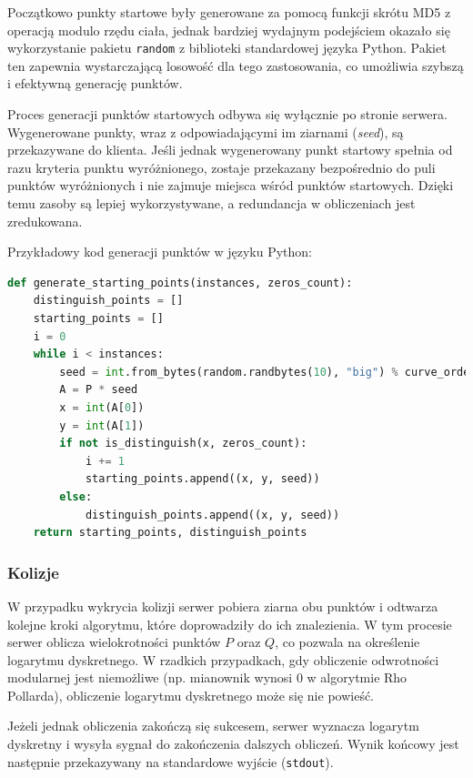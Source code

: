 Początkowo punkty startowe były generowane za pomocą funkcji skrótu MD5 z operacją
modulo rzędu ciała, jednak bardziej wydajnym podejściem okazało się wykorzystanie
pakietu \texttt{random} z biblioteki standardowej języka Python. Pakiet ten
zapewnia wystarczającą losowość dla tego zastosowania, co umożliwia szybszą
i efektywną generację punktów.

Proces generacji punktów startowych odbywa się wyłącznie po stronie serwera.
Wygenerowane punkty, wraz z odpowiadającymi im ziarnami (\textit{seed}), są
przekazywane do klienta. Jeśli jednak wygenerowany punkt startowy spełnia od razu
kryteria punktu wyróżnionego, zostaje przekazany bezpośrednio do puli punktów
wyróżnionych i nie zajmuje miejsca wśród punktów startowych. Dzięki temu zasoby
są lepiej wykorzystywane, a redundancja w obliczeniach jest zredukowana.

Przykładowy kod generacji punktów w języku Python:

\begin{lstlisting}[language=Python, caption=Generacja punktów startowych]
def generate_starting_points(instances, zeros_count):
    distinguish_points = []
    starting_points = []
    i = 0
    while i < instances:
        seed = int.from_bytes(random.randbytes(10), "big") % curve_order
        A = P * seed
        x = int(A[0])
        y = int(A[1])
        if not is_distinguish(x, zeros_count):
            i += 1
            starting_points.append((x, y, seed))
        else:
            distinguish_points.append((x, y, seed))
    return starting_points, distinguish_points
\end{lstlisting}

\subsubsection{Kolizje}

W przypadku wykrycia kolizji serwer pobiera ziarna obu punktów i odtwarza
kolejne kroki algorytmu, które doprowadziły do ich znalezienia. W tym procesie
serwer oblicza wielokrotności punktów $P$ oraz $Q$, co pozwala na określenie
logarytmu dyskretnego. W rzadkich przypadkach, gdy obliczenie odwrotności modularnej
jest niemożliwe (np. mianownik wynosi $0$ w algorytmie Rho Pollarda), obliczenie
logarytmu dyskretnego może się nie powieść.

Jeżeli jednak obliczenia zakończą się sukcesem, serwer wyznacza logarytm
dyskretny i wysyła sygnał do zakończenia dalszych obliczeń. Wynik końcowy jest
następnie przekazywany na standardowe wyjście (\texttt{stdout}).

